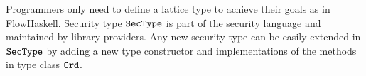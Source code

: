 \documentclass[a4paper]{report}
\newcommand{\co}[1]{$\cod{#1}$}
\newcommand{\is}{\sim}
\newcommand{\tagup}{\uparrow}
\begin{document}

Programmers only need to define a lattice type to achieve their goals as in FlowHaskell. 
Security type \co{SecType} is part of the security language and 
maintained by library providers. Any new security type can be easily extended 
in \co{SecType} by adding a new type constructor and implementations of the methods
in type class \co{Ord}.
\end{document}
